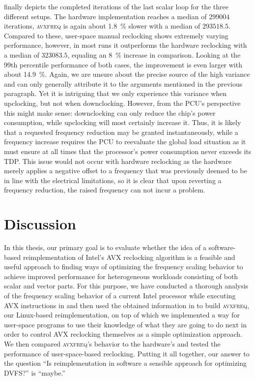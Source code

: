  finally depicts the completed iterations of the last scalar loop for the three different setups. The hardware implementation reaches a median of $299004$ iterations, \textsc{avxfreq} is again about \SI{1.8}{\percent} slower with a median of $293518.5$. Compared to these, user-space manual reclocking shows extremely varying performance, however, in most runs it outperforms the hardware reclocking with a median of $323083.5$, equaling an \SI{8}{\percent} increase in comparison. Looking at the 99th percentile performance of both cases, the improvement is even larger with about \SI{14.9}{\percent}. Again, we are unsure about the precise source of the high variance and can only generally attribute it to the arguments mentioned in the previous paragraph. Yet it is intriguing that we only experience this variance when upclocking, but not when downclocking. However, from the \gls{PCU}'s perspective this might make sense: downclocking can only reduce the chip's power consumption, while upclocking will most certainly increase it. Thus, it is likely that a requested frequency reduction may be granted instantaneously, while a frequency increase requires the \gls{PCU} to reevaluate the global load situation as it must ensure at all times that the processor's power consumption never exceeds its \gls{TDP}. This issue would not occur with hardware reclocking as the hardware merely applies a negative offset to a frequency that was previously deemed to be in line with the electrical limitations, so it is clear that upon reverting a frequency reduction, the raised frequency can not incur a problem.

\section{Discussion}
\label{sec:evaluation:discussion}

In this thesis, our primary goal is to evaluate whether the idea of a software-based reimplementation of Intel's \gls{AVX} reclocking algorithm is a feasible and useful approach to finding ways of optimizing the frequency scaling behavior to achieve improved performance for heterogeneous workloads consisting of both scalar and vector parts. For this purpose, we have conducted a thorough analysis of the frequency scaling behavior of a current Intel processor while executing \gls{AVX} instructions in  and then used the obtained information in  to build \textsc{avxfreq}, our \gls{Linux}-based reimplementation, on top of which we implemented a way for user-space programs to use their knowledge of what they are going to do next in order to control \gls{AVX} reclocking themselves as a simple optimization approach. We then compared \textsc{avxfreq}'s behavior to the hardware's and tested the performance of user-space-based reclocking. Putting it all together, our answer to the question \enquote{Is reimplementation in software a sensible approach for optimizing \gls{DVFS}?} is \enquote{maybe.}

